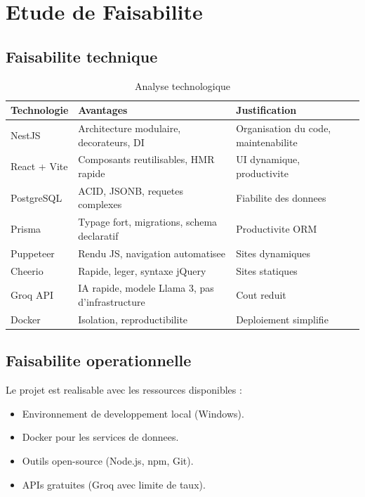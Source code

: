 \documentclass[12pt,a4paper]{report}
\begin{document}
\chapter{Etude de Faisabilite}

\section{Faisabilite technique}

\begin{table}[H]
\centering
\begin{tabular}{|p{3cm}|p{5cm}|p{5cm}|}
\hline
\textbf{Technologie} & \textbf{Avantages} & \textbf{Justification} \\
\hline
NestJS & Architecture modulaire, decorateurs, DI & Organisation du code, maintenabilite \\
\hline
React + Vite & Composants reutilisables, HMR rapide & UI dynamique, productivite \\
\hline
PostgreSQL & ACID, JSONB, requetes complexes & Fiabilite des donnees \\
\hline
Prisma & Typage fort, migrations, schema declaratif & Productivite ORM \\
\hline
Puppeteer & Rendu JS, navigation automatisee & Sites dynamiques \\
\hline
Cheerio & Rapide, leger, syntaxe jQuery & Sites statiques \\
\hline
Groq API & IA rapide, modele Llama 3, pas d'infrastructure & Cout reduit \\
\hline
Docker & Isolation, reproductibilite & Deploiement simplifie \\
\hline
\end{tabular}
\caption{Analyse technologique}
\end{table}

\section{Faisabilite operationnelle}

Le projet est realisable avec les ressources disponibles :
\begin{itemize}
  \item Environnement de developpement local (Windows).
  \item Docker pour les services de donnees.
  \item Outils open-source (Node.js, npm, Git).
  \item APIs gratuites (Groq avec limite de taux).
\end{itemize}
\end{document}
